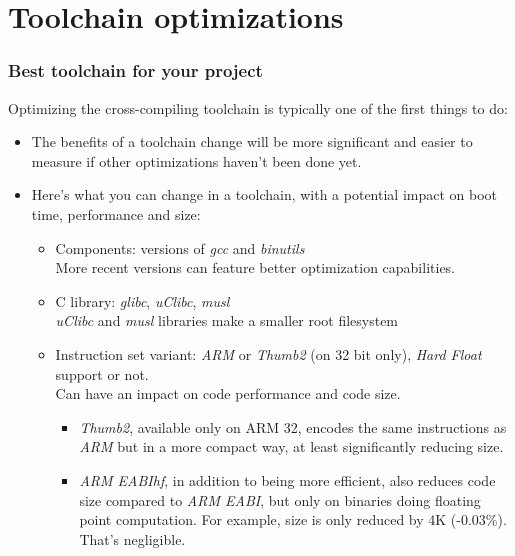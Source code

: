 \section{Toolchain optimizations}

\begin{frame}
\frametitle{Best toolchain for your project}
Optimizing the cross-compiling toolchain is typically one of the first
things to do:
\begin{itemize}
  \item The benefits of a toolchain change will be more significant and easier to
        measure if other optimizations haven't been done yet.
  \item Here's what you can change in a toolchain, with a potential
        impact on boot time, performance and size:
  \begin{itemize}
    \item Components: versions of {\em gcc} and {\em binutils}\\
          More recent versions can feature better optimization capabilities.
    \item C library: {\em glibc}, {\em uClibc}, {\em musl}\\
          {\em uClibc} and {\em musl} libraries make a smaller root
          filesystem
    \item Instruction set variant: {\em ARM} or {\em Thumb2} (on 32 bit
          only), {\em Hard Float} support or not.\\
          Can have an impact on code performance and code size.
          \begin{itemize}
            \item {\em Thumb2}, available only on ARM 32, encodes the same instructions
                  as {\em ARM} but in a more compact way, at least significantly reducing size.
            \item {\em ARM EABIhf}, in addition to being more efficient,
                  also reduces code size compared to {\em ARM EABI}, but
                  only on binaries doing floating point computation. For
                  example,  size is only reduced by 4K
                  (-0.03\%). That's negligible.
          \end{itemize}
  \end{itemize}
\end{itemize}
\end{frame}

